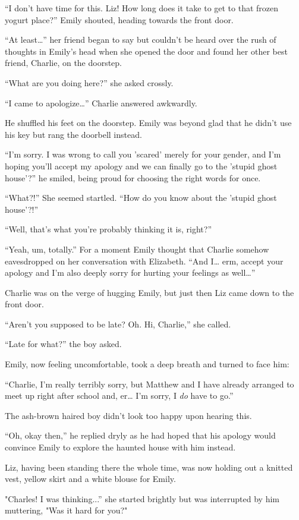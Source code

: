 “I don't have time for this. Liz! How long does it take to get to that frozen yogurt place?” Emily shouted, heading towards the front door.

“At least…” her friend began to say but couldn't be heard over the rush of thoughts in Emily's head when she opened the door and found her other best friend, Charlie, on the doorstep.

“What are you doing here?” she asked crossly.

“I came to apologize…” Charlie answered awkwardly.

He shuffled his feet on the doorstep. Emily was beyond glad that he didn't use his key but rang the doorbell instead.

“I'm sorry. I was wrong to call you 'scared' merely for your gender, and I'm hoping you'll accept my apology and we can finally go to the 'stupid ghost house'?” he smiled, being proud for choosing the right words for once.

“What?!” She seemed startled. “How do you know about the 'stupid ghost house'?!”

“Well, that's what you're probably thinking it is, right?”

“Yeah, um, totally.” For a moment Emily thought that Charlie somehow eavesdropped on her conversation with Elizabeth. “And I… erm, accept your apology and I'm also deeply sorry for hurting your feelings as well…”

Charlie was on the verge of hugging Emily, but just then Liz came down to the front door.

“Aren't you supposed to be late? Oh. Hi, Charlie,” she called.

“Late for what?” the boy asked.

Emily, now feeling uncomfortable, took a deep breath and turned to face him:

“Charlie, I'm really terribly sorry, but Matthew and I have already arranged to meet up right after school and, er… I'm sorry, I \textit{do} have to go.”

The ash-brown haired boy didn't look too happy upon hearing this.

“Oh, okay then,” he replied dryly as he had hoped that his apology would convince Emily to explore the haunted house with him instead.

Liz, having been standing there the whole time, was now holding out a knitted vest, yellow skirt and a white blouse for Emily.

"Charles! I was thinking...” she started brightly but was interrupted by him muttering, "Was it hard for you?"

